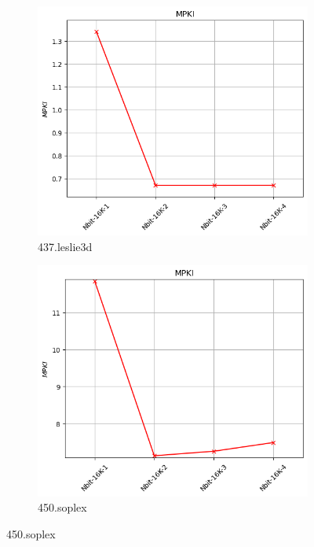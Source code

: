 \documentclass{article}
\begin{document}
\begin{figure}[H]
    \vspace{0.5cm} %

    \begin{subfigure}[b]{0.45\textwidth}
        \includegraphics[width=\textwidth]{figures/5_3/437.leslie3d.cslab_branch_preds_ref.out.png}
        \caption{437.leslie3d}
        \label{fig:plot9}
    \end{subfigure}
    \hfill
    \begin{subfigure}[b]{0.45\textwidth}
        \includegraphics[width=\textwidth]{figures/5_3/450.soplex.cslab_branch_preds_ref.out.png}
        \caption{450.soplex}
        \label{fig:plot10}
    \end{subfigure}


\end{figure}
\end{document}
